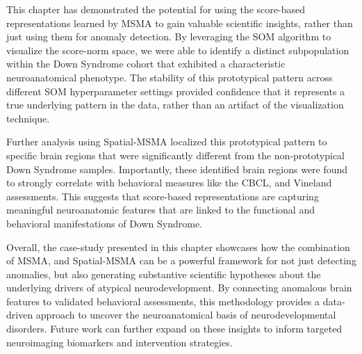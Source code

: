 This chapter has demonstrated the potential for using the score-based representations learned by MSMA to gain valuable scientific insights, rather than just using them for anomaly detection. By leveraging the SOM algorithm to visualize the score-norm space, we were able to identify a distinct subpopulation within the Down Syndrome cohort that exhibited a characteristic neuroanatomical phenotype. The stability of this prototypical pattern across different SOM hyperparameter settings provided confidence that it represents a true underlying pattern in the data, rather than an artifact of the visualization technique.

Further analysis using Spatial-MSMA localized this prototypical pattern to specific brain regions that were significantly different from the non-prototypical Down Syndrome samples. Importantly, these identified brain regions were found to strongly correlate with behavioral measures like the CBCL, and Vineland assessments. This suggests that score-based representations are capturing meaningful neuroanatomic features that are linked to the functional and behavioral manifestations of Down Syndrome.

Overall, the case-study presented in this chapter showcases how the combination of MSMA, and Spatial-MSMA can be a powerful framework for not just detecting anomalies, but also generating substantive scientific hypotheses about the underlying drivers of atypical neurodevelopment. By connecting anomalous brain features to validated behavioral assessments, this methodology provides a data-driven approach to uncover the neuroanatomical basis of neurodevelopmental disorders. Future work can further expand on these insights to inform targeted neuroimaging biomarkers and intervention strategies.